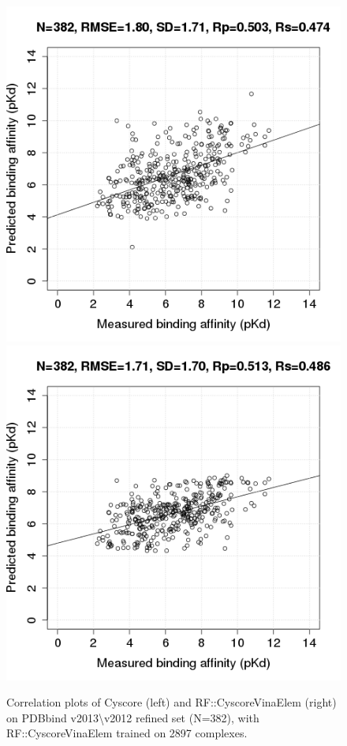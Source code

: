 \documentclass[journal=jacsat,manuscript=article]{achemso}
\begin{document}
\begin{figure}
\includegraphics[width=1.4\linewidth,natwidth=480,natheight=480]{../rfcyscore/x4/mlr/trn-247-tst-382-yp.png}
\endminipage\hfill
{}
\includegraphics[width=1.4\linewidth,natwidth=480,natheight=480]{../rfcyscore/x46/rf/trn-2897-tst-382-yp.png}
\endminipage\hfill
\caption{Correlation plots of Cyscore (left) and RF::CyscoreVinaElem (right) on PDBbind v2013\textbackslash v2012 refined set (N=382), with RF::CyscoreVinaElem trained on 2897 complexes.}
\label{fig:tst201}
\end{figure}
\end{document}

